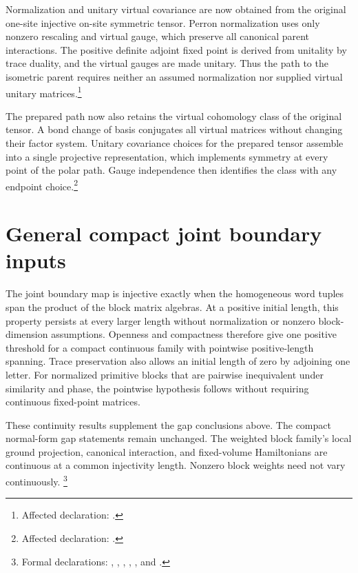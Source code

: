 \documentclass{article}
\begin{document}
Normalization and unitary virtual covariance are now obtained from the
original one-site injective on-site symmetric tensor. Perron normalization
uses only nonzero rescaling and virtual gauge, which preserve all canonical
parent interactions. The positive definite adjoint fixed point is derived
from unitality by trace duality, and the virtual gauges are made unitary.
Thus the path to the isometric parent requires neither an assumed
normalization nor supplied virtual unitary matrices.\footnote{Affected
    declaration:
    .}

The prepared path now also retains the virtual cohomology class of the
original tensor. A bond change of basis conjugates all virtual matrices
without changing their factor system. Unitary covariance choices for the
prepared tensor assemble into a single projective representation, which
implements symmetry at every point of the polar path. Gauge independence
then identifies the class with any endpoint choice.\footnote{Affected
    declaration:
    .}

\section{General compact joint boundary inputs}
The joint boundary map is injective exactly when the homogeneous word tuples
span the product of the block matrix algebras. At a positive initial length,
this property persists at every larger length without normalization or
nonzero block-dimension assumptions. Openness and compactness therefore give
one positive threshold for a compact continuous family with pointwise
positive-length spanning. Trace preservation also allows an initial length
of zero by adjoining one letter. For normalized primitive blocks that are
pairwise inequivalent under similarity and phase, the pointwise hypothesis
follows without requiring continuous fixed-point matrices.

These continuity results supplement the gap conclusions above.
The compact normal-form gap statements remain unchanged.
The weighted block family's local ground projection, canonical interaction,
and fixed-volume Hamiltonians are continuous at a common injectivity length.
Nonzero block weights need not vary continuously.
\footnote{Formal declarations:
    ,
    ,
    ,
    ,
    , and
    .}



\end{document}
